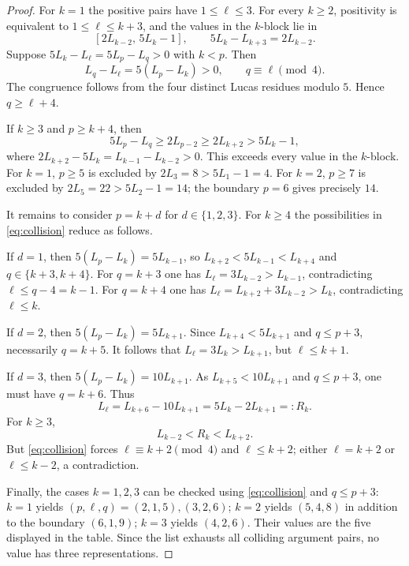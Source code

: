 \documentclass[11pt]{article}
\begin{document}
\begin{proof}
For $k=1$ the positive pairs have $1\le\ell\le3$.
For every $k\ge2$, positivity is equivalent to
$1\le\ell\le k+3$, and the values in the $k$-block lie in
\[
[2L_{k-2},\,5L_k-1],
\qquad 5L_k-L_{k+3}=2L_{k-2}.
\]
Suppose $5L_k-L_\ell=5L_p-L_q>0$ with $k<p$.
Then
\begin{equation}\label{eq:collision}
L_q-L_\ell=5(L_p-L_k)>0,\qquad q\equiv\ell\pmod4.
\end{equation}
The congruence follows from the four distinct Lucas residues modulo $5$.
Hence $q\ge\ell+4$.

If $k\ge3$ and $p\ge k+4$, then
\[
5L_p-L_q\ge2L_{p-2}\ge2L_{k+2}>5L_k-1,
\]
where $2L_{k+2}-5L_k=L_{k-1}-L_{k-2}>0$.
This exceeds every value in the $k$-block.
For $k=1$, $p\ge5$ is excluded by
$2L_3=8>5L_1-1=4$.
For $k=2$, $p\ge7$ is excluded by
$2L_5=22>5L_2-1=14$; the boundary $p=6$
gives precisely $14$.

It remains to consider $p=k+d$ for $d\in\{1,2,3\}$.
For $k\ge4$ the possibilities in \eqref{eq:collision}
reduce as follows.

If $d=1$, then $5(L_p-L_k)=5L_{k-1}$,
so $L_{k+2}<5L_{k-1}<L_{k+4}$ and
$q\in\{k+3,k+4\}$.
For $q=k+3$ one has
$L_\ell=3L_{k-2}>L_{k-1}$, contradicting
$\ell\le q-4=k-1$.
For $q=k+4$ one has
$L_\ell=L_{k+2}+3L_{k-2}>L_k$,
contradicting $\ell\le k$.

If $d=2$, then $5(L_p-L_k)=5L_{k+1}$.
Since $L_{k+4}<5L_{k+1}$ and $q\le p+3$,
necessarily $q=k+5$.
It follows that
$L_\ell=3L_k>L_{k+1}$, but $\ell\le k+1$.

If $d=3$, then $5(L_p-L_k)=10L_{k+1}$.
As $L_{k+5}<10L_{k+1}$ and $q\le p+3$,
one must have $q=k+6$. Thus
\[
L_\ell=L_{k+6}-10L_{k+1}
=5L_k-2L_{k+1}=:R_k.
\]
For $k\ge3$,
\[
L_{k-2}<R_k<L_{k+2}.
\]
But \eqref{eq:collision} forces
$\ell\equiv k+2\pmod4$ and $\ell\le k+2$;
either $\ell=k+2$ or $\ell\le k-2$, a contradiction.

Finally, the cases $k=1,2,3$ can be checked using
\eqref{eq:collision} and $q\le p+3$:
$k=1$ yields $(p,\ell,q)=(2,1,5),(3,2,6)$;
$k=2$ yields $(5,4,8)$ in addition to the
boundary $(6,1,9)$; $k=3$ yields $(4,2,6)$.
Their values are the five displayed in the table.
Since the list exhausts all colliding argument pairs,
no value has three representations.
\end{proof}
\end{document}

